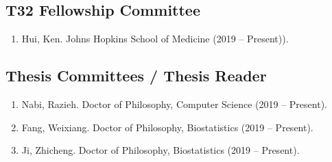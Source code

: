 \documentclass[10pt]{article}
\newcommand{\dn}[1]{{\color{black} {#1}}}
\newcommand{\myben}[1]{\smallskip\begin{enumerate}[start=1,label={\scriptsize \arabic*$\ $},leftmargin=\parindent]\setlength{\itemsep}{#1}\vspace*{-0.7em}}
\newcommand{\ee}{\end{enumerate}}
\newcommand{\mylift}[1]{\vspace*{#1}}
\begin{document}
\subsection*{T32 Fellowship Committee}

\myben{-0.1em}

\item Hui, Ken. Johns Hopkins School of Medicine (2019 -- Present)).

\ee

\mylift{-1.5em}

\subsection*{Thesis Committees / Thesis Reader}

\myben{-0.1em}

\item \dn{Nabi}, Razieh. Doctor of Philosophy, Computer Science (2019 -- Present).
\item \dn{Fang}, Weixiang. Doctor of Philosophy, Biostatistics (2019 -- Present).
\item \dn{Ji}, Zhicheng. Doctor of Philosophy, Biostatistics (2019 -- Present).

\ee








\end{document}
